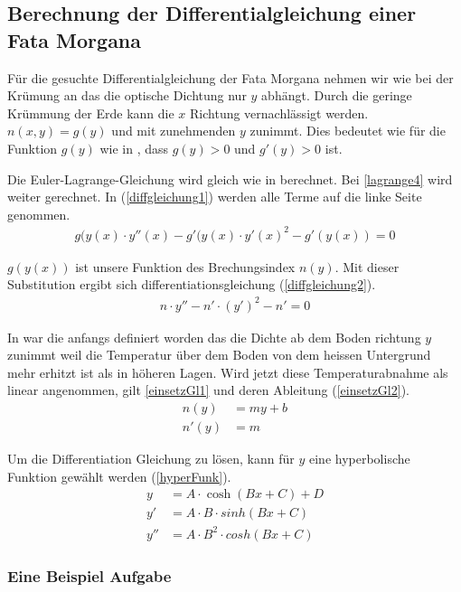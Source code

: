 \subsection{Berechnung der Differentialgleichung einer Fata Morgana}

Für die gesuchte Differentialgleichung der Fata Morgana nehmen wir wie bei der Krümung an das die optische Dichtung nur $y$ abhängt. Durch die geringe Krümmung der Erde kann die $x$ Richtung vernachlässigt werden.
$n(x,y) = g(y)$ und mit zunehmenden $y$ zunimmt. Dies bedeutet wie für die Funktion $g(y)$ wie in , dass $g(y) > 0$ und $g'(y) > 0 $ ist.

Die Euler-Lagrange-Gleichung wird gleich wie in  berechnet. Bei \eqref{lagrange4} wird weiter gerechnet. In (\eqref{diffgleichung1}) werden alle Terme auf die linke Seite genommen.
\begin{align}
	g(y(x)\cdot y''(x)-g'(y(x)\cdot y'(x)^2 - g'(y(x)) =0 
	\label{diffgleichung1}
\end{align}

$g(y(x))$ ist unsere Funktion des Brechungsindex $n(y)$. Mit dieser Substitution ergibt sich differentiationsgleichung (\eqref{diffgleichung2}).
\begin{align}
	n\cdot y''-n'\cdot (y')^2 - n' =0 
	\label{diffgleichung2}
\end{align}

In  war die anfangs definiert worden das die Dichte ab dem Boden richtung $y$ zunimmt weil die Temperatur über dem Boden von dem heissen Untergrund mehr erhitzt ist als in höheren Lagen. Wird jetzt diese Temperaturabnahme als linear angenommen, gilt \eqref{einsetzGl1} und deren Ableitung (\eqref{einsetzGl2}).
\begin{align}
	n(y)&=my+b \label{einsetzGl1} \\
	n'(y)&=m \label{einsetzGl2}
\end{align}

Um die Differentiation Gleichung zu lösen, kann für $y$ eine hyperbolische Funktion gewählt werden (\eqref{hyperFunk}).
\begin{align}
	y&=A\cdot\cosh(Bx+C)+D \label{hyperFunk} \\
	y'&= A\cdot B\cdot sinh(B x + C) \label{hyperFunkDx} \\
	y''&= A\cdot B^2\cdot cosh(B x + C) \label{hyperFunkD2x}
\end{align}


\subsubsection{Eine Beispiel Aufgabe}

